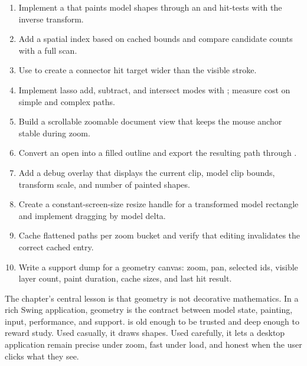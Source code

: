 \begin{exercisebox}
\begin{enumerate}
\item Implement a  that paints model shapes through an  and hit-tests with the inverse transform.
\item Add a spatial index based on cached  bounds and compare candidate counts with a full scan.
\item Use  to create a connector hit target wider than the visible stroke.
\item Implement lasso add, subtract, and intersect modes with ; measure cost on simple and complex paths.
\item Build a scrollable zoomable document view that keeps the mouse anchor stable during zoom.
\item Convert an open  into a filled outline and export the resulting path through .
\item Add a debug overlay that displays the current clip, model clip bounds, transform scale, and number of painted shapes.
\item Create a constant-screen-size resize handle for a transformed model rectangle and implement dragging by model delta.
\item Cache flattened paths per zoom bucket and verify that editing invalidates the correct cached entry.
\item Write a support dump for a geometry canvas: zoom, pan, selected ids, visible layer count, paint duration, cache sizes, and last hit result.
\end{enumerate}
\end{exercisebox}

The chapter's central lesson is that geometry is not decorative mathematics. In a rich Swing application, geometry is the contract between model state, painting, input, performance, and support.  is old enough to be trusted and deep enough to reward study. Used casually, it draws shapes. Used carefully, it lets a desktop application remain precise under zoom, fast under load, and honest when the user clicks what they see.
